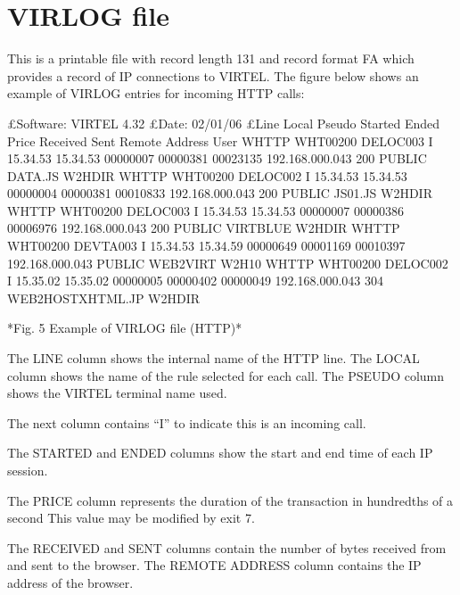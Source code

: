 \documentclass[letterpaper,10pt,english]{sphinxmanual}
\begin{document}

\ignorespaces 

\section{VIRLOG file}
\label{\detokenize{audit_operations_ and_performance:virlog-file}}\label{\detokenize{audit_operations_ and_performance:index-74}}
This is a printable file with record length 131 and record format FA which provides a record of IP connections to VIRTEL. The figure below shows an example of VIRLOG entries for incoming
HTTP calls:

\begin{sphinxVerbatim}[commandchars=\\\{\}]
£Software: VIRTEL 4.32
£Date: 02/01/06
£Line Local Pseudo Started Ended Price Received Sent Remote Address User
W\PYGZhy{}HTTP WHT00200 DELOC003 I 15.34.53 15.34.53 00000007 00000381 00023135 192.168.000.043 200 PUBLIC DATA.JS W2H\PYGZhy{}DIR
W\PYGZhy{}HTTP WHT00200 DELOC002 I 15.34.53 15.34.53 00000004 00000381 00010833 192.168.000.043 200 PUBLIC JS01.JS W2H\PYGZhy{}DIR
W\PYGZhy{}HTTP WHT00200 DELOC003 I 15.34.53 15.34.53 00000007 00000386 00006976 192.168.000.043 200 PUBLIC VIRTBLUE W2H\PYGZhy{}DIR
W\PYGZhy{}HTTP WHT00200 DEVTA003 I 15.34.53 15.34.59 00000649 00001169 00010397 192.168.000.043 PUBLIC WEB2VIRT W2H\PYGZhy{}10
W\PYGZhy{}HTTP WHT00200 DELOC002 I 15.35.02 15.35.02 00000005 00000402 00000049 192.168.000.043 304 WEB2HOSTXHTML.JP W2H\PYGZhy{}DIR

*Fig. 5 Example of VIRLOG file (HTTP)*
\end{sphinxVerbatim}

The LINE column shows the internal name of the HTTP line.
The LOCAL column shows the name of the rule selected for each call.
The PSEUDO column shows the VIRTEL terminal name used.

The next column contains “I” to indicate this is an incoming call.

The STARTED and ENDED columns show the start and end time of each IP session.

The PRICE column represents the duration of the transaction in hundredths of a second This value may be modified by exit 7.

The RECEIVED and SENT columns contain the number of bytes received from and sent to the browser. The REMOTE ADDRESS column contains the IP address of the browser.
\end{document}
